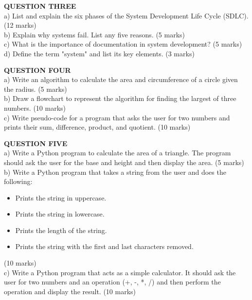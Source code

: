 \documentclass[12pt]{article}
\begin{document}
\vspace{0.5cm}

\noindent
\textbf{QUESTION THREE}\\
a) List and explain the six phases of the System Development Life Cycle (SDLC). \hfill (12 marks)\\
b) Explain why systems fail. List any five reasons. \hfill (5 marks)\\
c) What is the importance of documentation in system development? \hfill (5 marks)\\
d) Define the term "system" and list its key elements. \hfill (3 marks)\\

\vspace{0.5cm}

\noindent
\textbf{QUESTION FOUR}\\
a) Write an algorithm to calculate the area and circumference of a circle given the radius. \hfill (5 marks)\\
b) Draw a flowchart to represent the algorithm for finding the largest of three numbers. \hfill (10 marks)\\
c) Write pseudo-code for a program that asks the user for two numbers and prints their sum, difference, product, and quotient. \hfill (10 marks)\\

\vspace{0.5cm}

\noindent
\textbf{QUESTION FIVE}\\
a) Write a Python program to calculate the area of a triangle. The program should ask the user for the base and height and then display the area. \hfill (5 marks)\\
b) Write a Python program that takes a string from the user and does the following:
    \begin{itemize}
        \item Prints the string in uppercase.
        \item Prints the string in lowercase.
        \item Prints the length of the string.
        \item Prints the string with the first and last characters removed.
    \end{itemize}
    \hfill (10 marks)\\
c) Write a Python program that acts as a simple calculator. It should ask the user for two numbers and an operation (+, -, *, /) and then perform the operation and display the result. \hfill (10 marks)\\
\end{document}
